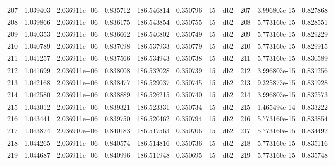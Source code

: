 \begin{tabular}{lrrrrrrlrrr}
207  &    1.039403 &        2.036911e+06 &  0.835712 &              186.546814 &    0.350796 &      15 &          db2 &    207 &   3.996803e-15 &      0.827868 \\
208  &    1.039866 &        2.036911e+06 &  0.836175 &              186.543854 &    0.350755 &      15 &          db2 &    208 &   5.773160e-15 &      0.828551 \\
209  &    1.040353 &        2.036911e+06 &  0.836662 &              186.540802 &    0.350749 &      15 &          db2 &    209 &   5.773160e-15 &      0.829229 \\
210  &    1.040789 &        2.036911e+06 &  0.837098 &              186.537933 &    0.350779 &      15 &          db2 &    210 &   5.773160e-15 &      0.829915 \\
211  &    1.041257 &        2.036911e+06 &  0.837566 &              186.534943 &    0.350738 &      15 &          db2 &    211 &   5.773160e-15 &      0.830589 \\
212  &    1.041699 &        2.036911e+06 &  0.838008 &              186.532028 &    0.350739 &      15 &          db2 &    212 &   3.996803e-15 &      0.831256 \\
213  &    1.042168 &        2.036911e+06 &  0.838477 &              186.529037 &    0.350745 &      15 &          db2 &    213 &   9.325873e-15 &      0.831928 \\
214  &    1.042580 &        2.036911e+06 &  0.838889 &              186.526215 &    0.350740 &      15 &          db2 &    214 &   3.996803e-15 &      0.832573 \\
215  &    1.043012 &        2.036911e+06 &  0.839321 &              186.523331 &    0.350734 &      15 &          db2 &    215 &   1.465494e-14 &      0.833222 \\
216  &    1.043441 &        2.036911e+06 &  0.839750 &              186.520462 &    0.350794 &      15 &          db2 &    216 &   5.773160e-15 &      0.833854 \\
217  &    1.043874 &        2.036910e+06 &  0.840183 &              186.517563 &    0.350706 &      15 &          db2 &    217 &   5.773160e-15 &      0.834492 \\
218  &    1.044265 &        2.036911e+06 &  0.840574 &              186.514816 &    0.350736 &      15 &          db2 &    218 &   5.773160e-15 &      0.835116 \\
219  &    1.044687 &        2.036911e+06 &  0.840996 &              186.511948 &    0.350695 &      15 &          db2 &    219 &   5.773160e-15 &      0.835748 \\

\end{tabular}
